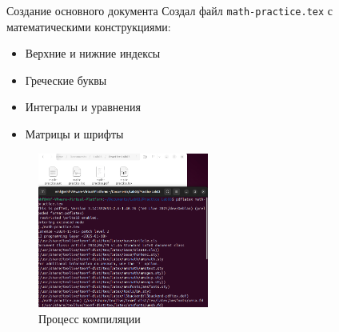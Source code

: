 \begin{frame}[fragile]{Создание основного документа}
\label{ux441ux43eux437ux434ux430ux43dux438ux435-ux43eux441ux43dux43eux432ux43dux43eux433ux43e-ux434ux43eux43aux443ux43cux435ux43dux442ux430}
Создал файл \texttt{math-practice.tex} с математическими конструкциями:

\begin{itemize}
\tightlist
\item
  Верхние и нижние индексы
\item
  Греческие буквы
\item
  Интегралы и уравнения
\item
  Матрицы и шрифты
\end{itemize}

\begin{figure}
\centering
\includegraphics[width=0.5\textwidth,height=\textheight]{image_01.jpg}
\caption{Процесс компиляции}
\end{figure}
\end{frame}

